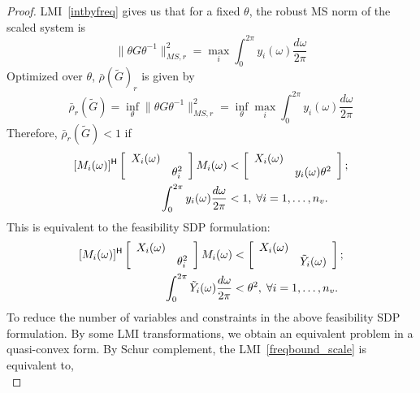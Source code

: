 \begin{proof}
LMI~\ref{intbyfreq} gives us that for a fixed $\theta$, the robust MS norm of the scaled system is
$$
\|\theta G \theta^{-1}\|_{MS,r}^2=\max_i{ \int_0^{2\pi}y_i(\omega)\frac{d\omega}{2\pi}}
$$
Optimized over $\theta$, $\bar{\rho}(\tilde{G})_r$ is given by
\begin{equation}
    \bar{\rho}_r(\tilde{G})=\inf_{\theta}\|\theta G \theta^{-1}\|_{MS,r}^2=\inf_{\theta}\max_i{ \int_0^{2\pi}y_i(\omega)\frac{d\omega}{2\pi}}
\end{equation}
Therefore, $\bar{\rho}_r(\tilde{G})<1$ if
\begin{subequations}
\begin{align}
    [M_i(\omega)]^{\mathsf{H}}
    \left[
    \begin{array}{cc}
    X_i(\omega) &  \\
     & \theta_i^2
    \end{array}\right]
    M_i(\omega)
& <\left[
\begin{array}{cc}
    X_i(\omega) &  \\
     & y_i(\omega)\theta^2   
\end{array}\right] ; \\
\int_0^{2\pi}y_i(\omega)\frac{d\omega}{2\pi} & < 1,\; \forall i=1,\ldots,n_v.\label{eqn:freqsum}
\end{align}
\end{subequations}
This is equivalent to the feasibility SDP formulation:
\begin{subequations}
\begin{align}
    [M_i(\omega)]^{\mathsf{H}}
    \left[
    \begin{array}{cc}
    X_i(\omega) &  \\
     & \theta_i^2
    \end{array}\right]
    M_i(\omega)
& <\left[
\begin{array}{cc}
    X_i(\omega) &  \\
     & \tilde{Y}_i(\omega)   
\end{array}\right] ; \\
\int_0^{2\pi} \tilde{Y}_i(\omega)\frac{d\omega}{2\pi} & < \theta^2,\; \forall i=1,\ldots,n_v.
\end{align}
\end{subequations}
To reduce the number of variables and constraints in the above feasibility SDP formulation.
By some LMI transformations, we obtain an equivalent problem in a quasi-convex form. By Schur complement, the LMI~\eqref{freqbound_scale} is equivalent to,
\begin{equation*}

\end{equation*}
\end{proof}
